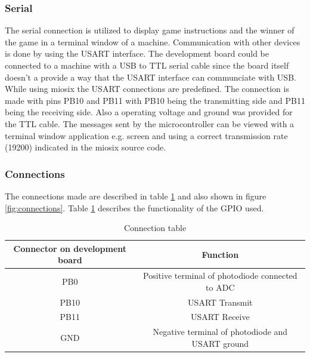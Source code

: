 \subsubsection{Serial}
The serial connection is utilized to display game instructions and the winner of the game in a terminal window of a machine. Communication with other devices is done by using the USART interface. The development board could be connected to a machine with a USB to TTL serial cable since the board itself doesn't a provide a way that the USART interface can communciate with USB. While using miosix the USART connections are predefined. The connection is made with pins PB10 and PB11 with PB10 being the transmitting side and PB11 being the receiving side. Also a operating voltage and ground was provided for the TTL cable. The messages sent by the microcontroller can be viewed with a terminal window application e.g. screen and using a correct transmission rate (19200) indicated in the miosix source code.



\subsubsection{Connections}
The connections made are described in table \ref{table:1} and also shown in figure \ref{fig:connections}. Table \ref{table:1} describes the functionality of the GPIO used.

\begin{table}
\caption{Connection table}
\label{table:1}
\begin{center}
\begin{tabular}{ |c|c| } 
 \hline
 Connector on development board & Function\\ 
 \hline
 PB0 & Positive terminal of photodiode connected to ADC \\
 PB10 & USART Transmit \\
 PB11 & USART Receive \\
 GND & Negative terminal of photodiode and USART ground \\
 \hline
\end{tabular}
\end{center}
\end{table}

